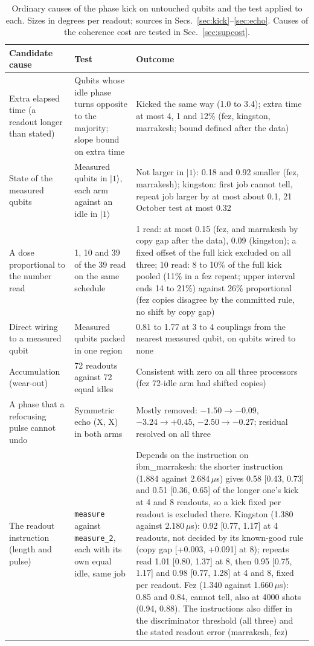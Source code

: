 \documentclass[reprint,amsmath,amssymb,aps,superscriptaddress,nofootinbib]{revtex4-2}
\newcommand{\us}{\,$\mu$s}
\begin{document}
\begin{table}[!tp]
\caption{Ordinary causes of the phase kick on untouched qubits and the test applied to each. Sizes in degrees per readout; sources in Secs.~\ref{sec:kick}--\ref{sec:echo}. Causes of the coherence cost are tested in Sec.~\ref{sec:supcost}.}
\label{tab:causes}
\footnotesize
\begin{tabular}{p{3.6cm}p{6.4cm}p{6.6cm}}
\hline\hline
Candidate cause & Test & Outcome \\
\hline
Extra elapsed time (a readout longer than stated) & Qubits whose idle phase turns opposite to the majority; slope bound on extra time & Kicked the same way (1.0 to 3.4); extra time at most 4, 1 and 12\% (fez, kingston, marrakesh; bound defined after the data) \\
State of the measured qubits & Measured qubits in $|1\rangle$, each arm against an idle in $|1\rangle$ & Not larger in $|1\rangle$: 0.18 and 0.92 smaller (fez, marrakesh); kingston: first job cannot tell, repeat job larger by at most about 0.1, 21 October test at most 0.32 \\
A dose proportional to the number read & 1, 10 and 39 of the 39 read on the same schedule & 1 read: at most 0.15 (fez, and marrakesh by copy gap after the data), 0.09 (kingston); a fixed offset of the full kick excluded on all three; 10 read: 8 to 10\% of the full kick pooled (11\% in a fez repeat; upper interval ends 14 to 21\%) against 26\% proportional (fez copies disagree by the committed rule, no shift by copy gap) \\
Direct wiring to a measured qubit & Measured qubits packed in one region & 0.81 to 1.77 at 3 to 4 couplings from the nearest measured qubit, on qubits wired to none \\
Accumulation (wear-out) & 72 readouts against 72 equal idles & Consistent with zero on all three processors (fez 72-idle arm had shifted copies) \\
A phase that a refocusing pulse cannot undo & Symmetric echo (X, X) in both arms & Mostly removed: $-1.50 \to -0.09$, $-3.24 \to +0.45$, $-2.50 \to -0.27$; residual resolved on all three \\
The readout instruction (length and pulse) & \texttt{measure} against \texttt{measure\_2}, each with its own equal idle, same job & Depends on the instruction on ibm\_marrakesh: the shorter instruction (1.884 against 2.684\us) gives 0.58 [0.43, 0.73] and 0.51 [0.36, 0.65] of the longer one's kick at 4 and 8 readouts, so a kick fixed per readout is excluded there. Kingston (1.380 against 2.180\us): 0.92 [0.77, 1.17] at 4 readouts, not decided by its known-good rule (copy gap [+0.003, +0.091] at 8); repeats read 1.01 [0.80, 1.37] at 8, then 0.95 [0.75, 1.17] and 0.98 [0.77, 1.28] at 4 and 8, fixed per readout. Fez (1.340 against 1.660\us): 0.85 and 0.84, cannot tell, also at 4000 shots (0.94, 0.88). The instructions also differ in the discriminator threshold (all three) and the stated readout error (marrakesh, fez) \\
\hline\hline
\end{tabular}
\end{table}
\end{document}
